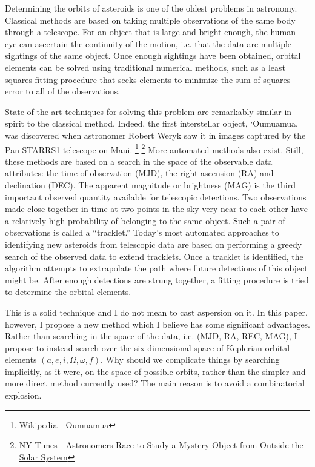 Determining the orbits of asteroids is one of the oldest problems in astronomy.
Classical methods are based on taking multiple observations of the same body through a telescope.
For an object that is large and bright enough, the human eye can ascertain the continuity of the motion,
i.e. that the data are multiple sightings of the same object.
Once enough sightings have been obtained, orbital elements can be solved using traditional
numerical methods, such as a least squares fitting procedure that seeks elements to minimize
the sum of squares error to all of the observations.

State of the art techniques for solving this problem are remarkably similar in spirit to the classical method.
Indeed, the first interstellar object, `Oumuamua, was discovered when astronomer Robert Weryk
saw it in images captured by the Pan-STARRS1 telescope on Maui.
\footnote{\href{https://en.wikipedia.org/wiki/\%CA\%BBOumuamua}{Wikipedia - Oumuamua}}
\footnote{\href{https://www.nytimes.com/2017/10/27/science/interstellar-object-solar-system.html}{NY Times - Astronomers Race to Study a Mystery Object from Outside the Solar System}}
More automated methods also exist.
Still, these methods are based on a search in the space of the observable data attributes: the time of observation (MJD), the right ascension (RA) and declination (DEC).
The apparent magnitude or brightness (MAG) is the third important observed quantity available for telescopic detections.
Two observations made close together in time at two points in the sky very near to each other have a relatively high probability of belonging to the same object.
Such a pair of observations is called a ``tracklet.''
Today's most automated approaches to identifying new asteroids from telescopic data are based on performing a greedy search of the observed data to extend tracklets.
Once a tracklet is identified, the algorithm attempts to extrapolate the path where future detections of this object might be.
After enough detections are strung together, a fitting procedure is tried to determine the orbital elements.

This is a solid technique and I do not mean to cast aspersion on it.
In this paper, however, I propose a new method which I believe has some significant advantages.
Rather than searching in the space of the data, i.e. (MJD, RA, REC, MAG), I propose to instead search over the six dimensional space of 
Keplerian orbital elements $(a, e, i, \Omega, \omega, f)$.
Why should we complicate things by searching implicitly, as it were, on the space of possible orbits,
rather than the simpler and more direct method currently used?
The main reason is to avoid a combinatorial explosion.

